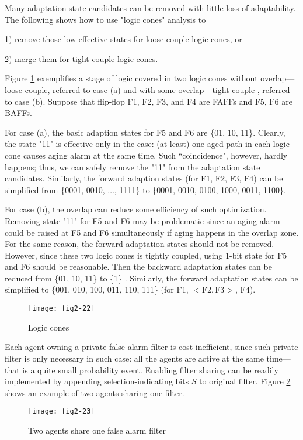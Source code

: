 Many adaptation state candidates can be removed with little loss of adaptability. The following shows how to use "logic cones" analysis to

1) remove those low-effective states for loose-couple logic cones, or

2) merge them for tight-couple logic cones.

\exmp Figure \ref{logiccone} exemplifies a stage of logic covered in two logic cones without overlap---loose-couple, referred to case (a) and with some overlap---tight-couple , referred to case (b). Suppose that flip-flop F1, F2, F3, and F4 are FAFFs and F5, F6 are BAFFs.

For case (a), the basic adaption states for F5 and F6 are \{01, 10, 11\}. Clearly, the state "11" is effective only in the case: (at least) one aged path in each logic cone causes aging alarm at the same time. Such ``coincidence", however, hardly happens; thus, we can safely remove the "11" from the adaptation state candidates. Similarly, the forward adaption states (for F1, F2, F3, F4) can be simplified from \{0001, 0010, $\ldots$, 1111\} to \{0001, 0010, 0100, 1000, 0011, 1100\}.

For case (b), the overlap can reduce some efficiency of such optimization. Removing state "11" for F5 and F6 may be problematic since an aging alarm could be raised at F5 and F6 simultaneously if aging happens in the overlap zone. For the same reason, the forward adaptation states should not be removed. However, since these two logic cones is tightly coupled, using 1-bit state for F5 and F6 should be reasonable. Then the backward adaptation states can be reduced from \{01, 10, 11\} to \{1\} . Similarly, the forward adaptation states can be simplified to \{001, 010, 100, 011, 110, 111\} (for F1, $<$F2,\,F3$>$, F4).


\begin{figure}[t]
\centering
\texttt{[image: fig2-22]}%
   \caption{Logic cones}\label{logiccone}
\end{figure}

Each agent owning a private false-alarm filter is cost-inefficient, since such private filter is only necessary in such case: all the agents are active at the same time---that is a quite small probability event. Enabling filter sharing  can be readily implemented by appending selection-indicating bits $S$ to original filter. Figure \ref{agent_share} shows an example of two agents sharing one filter.

\begin{figure}[t]
\centering
\texttt{[image: fig2-23]}%
   \caption{Two agents share one false alarm filter}\label{agent_share}
\end{figure}


